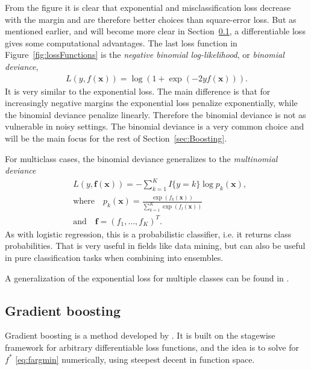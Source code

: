 From the figure it is clear that exponential and misclassification loss decrease with the margin and are therefore better choices than square-error loss. But as mentioned earlier, and will become more clear in Section~\ref{sub:Gradient boosting}, a differentiable loss gives some computational advantages. The last loss function in Figure~\ref{fig:lossFunctions} is the \textit{negative binomial log-likelihood}, or \textit{binomial deviance},
\begin{align}
  L(y, f(\mathbf{x})) = \log \left( 1 + \exp (-2 y f(\mathbf{x})) \right).
\end{align}
It is very similar to the exponential loss. The main difference is that for increasingly negative margins the exponential loss penalize exponentially, while the binomial deviance penalize linearly. Therefore the binomial deviance is not as vulnerable in noisy settings. The binomial deviance is a very common choice and will be the main focus for the rest of Section~\ref{sec:Boosting}. 

For multiclass cases, the binomial deviance generalizes to the \textit{multinomial deviance}
\begin{align}
  \label{eq:multinomialDeviance} 
  &L(y, \mathbf{f}( \mathbf{x })) = - \sum^{K}_{k=1} I\{y = k\} \log p_k(\mathbf{x}), \\
  \label{eq:multinomialDevianceProb} 
  &\text{where} \quad p_k(\mathbf{x}) = \frac{\exp (f_k(\mathbf{x}))}{\sum^{K}_{k=1} \exp (f_l(\mathbf{x}))}\\
  &\text{and} \quad \mathbf{f} = (f_1, \ldots, f_K)^T.
\end{align}
As with logistic regression, this is a probabilistic classifier, i.e. it returns class probabilities. That is very useful in fields like data mining, but can also be useful in pure classification tasks when combining into ensembles. 

A generalization of the exponential loss for multiple classes can be found in \cite{zhu2009}.
\subsection{Gradient boosting}
\label{sub:Gradient boosting}
Gradient boosting is a method developed by \cite{friedman}. It is built on the stagewise framework for arbitrary differentiable loss functions, and the idea is to solve for $f^*$ \eqref{eq:fargmin} numerically, using steepest decent in function space.

